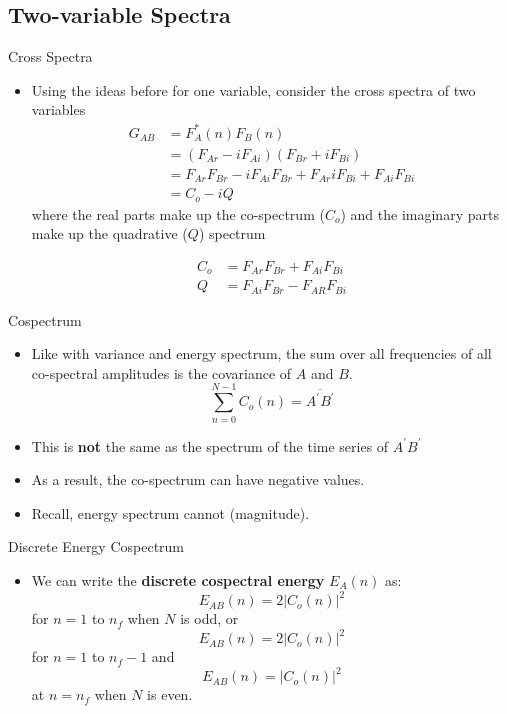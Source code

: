 \subsection{Two-variable Spectra} %
\begin{frame}{Cross Spectra}
\begin{itemize}
	\item Using the ideas before for one variable, consider the cross spectra of two variables
	\begin{align*}
	G_{AB} &= F^*_A(n) F_B(n)\\
	&= (F_{Ar}-iF_{Ai})(F_{Br} + iF_{Bi})\\
	&= F_{Ar} F_{Br} - iF_{Ai} F_{Br} + F_{Ar} iF_{Bi} +F_{Ai}F_{Bi}\\
	&= C_o - iQ	
	\end{align*}
where the real parts make up the co-spectrum ($C_o$) and the imaginary parts make up the quadrative ($Q$) spectrum

\begin{align*}
C_o &= 	F_{Ar} F_{Br} + F_{Ai}F_{Bi}\\
Q &= F_{Ai} F_{Br} - F_{AR}F_{Bi}
\end{align*}
\end{itemize}
\end{frame}
\begin{frame}{Cospectrum}
\begin{itemize}
	\item Like with variance and energy spectrum, the sum over all frequencies of all co-spectral amplitudes is the covariance of $A$ and $B$.
	$$\displaystyle \sum\limits_{n=0}^{N-1} C_o(n) = \overline{A^\prime B^\prime}$$
	\item This is \textbf{not} the same as the spectrum of the time series of $A^\prime B^\prime$
	\item As a result, the co-spectrum can have negative values.
	\item Recall, energy spectrum cannot (magnitude).
\end{itemize}
\end{frame}
\begin{frame}{Discrete Energy Cospectrum}
\begin{itemize}
	\item We can write the \textbf{discrete cospectral energy} $E_A(n)$ as:
	$$E_{AB}(n) = 2|C_o(n)|^2$$
	for $n=1$ to $n_f$ when $N$ is odd, or
	$$E_{AB}(n) = 2|C_o(n)|^2$$ for $n=1$ to $n_f-1$ and 
	$$E_{AB}(n) = |C_o(n)|^2$$ at $n=n_f$ when $N$ is even.
\end{itemize}
\end{frame}

